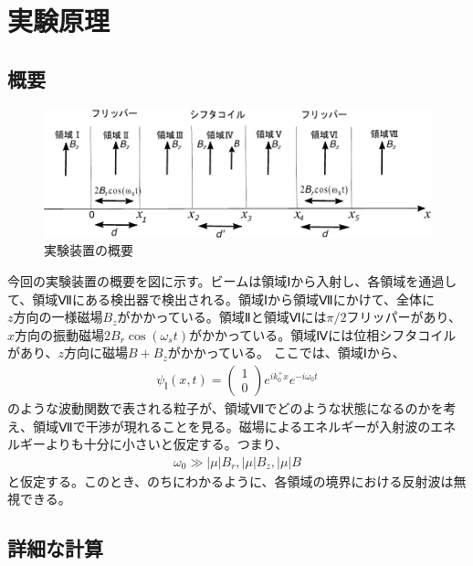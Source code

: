 \section{実験原理}\label{pi2flipper_sec}
\subsection{概要}
\begin{figure}[h]
\begin{center}
\includegraphics[width=13cm]{pi2flipper/zenntaizu.pdf}
\caption{実験装置の概要}
\end{center}
\end{figure}
今回の実験装置の概要を図に示す。ビームは領域Ⅰから入射し、各領域を通過して、領域Ⅶにある検出器で検出される。領域Ⅰから領域Ⅶにかけて、全体に$z方向の一様磁場B_{z}$がかかっている。領域Ⅱと領域Ⅵには$\pi/2フリッパー$があり、$x方向の振動磁場2B_{r}\cos(\omega_{s}t)$がかかっている。領域Ⅳには位相シフタコイルがあり、$z方向に磁場B+B_{z}$がかかっている。
ここでは、領域Ⅰから、
\begin{align}
{\psi}_{Ⅰ}(x,t)=
\begin{pmatrix}
1 \\
0
\end{pmatrix}
e^{ik_{0}^{+}x}e^{-i\omega_{0}t}
\end{align}
のような波動関数で表される粒子が、領域Ⅶでどのような状態になるのかを考え、領域Ⅶで干渉が現れることを見る。磁場によるエネルギーが入射波のエネルギーよりも十分に小さいと仮定する。つまり、
\begin{align}
\omega_{0} \gg |{\mu}|B_{r},  |{\mu}|B_{z},  |{\mu}|B
\end{align}
と仮定する。このとき、のちにわかるように、各領域の境界における反射波は無視できる。
\subsection{詳細な計算}
